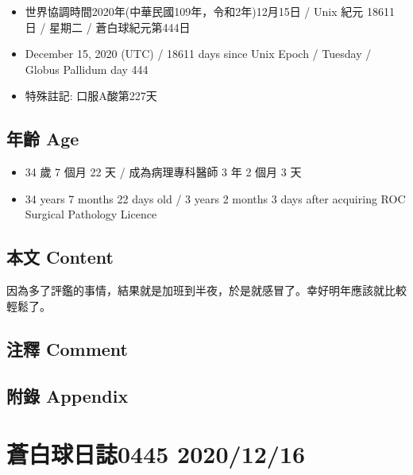 \documentclass[a5paper, 11pt
]{book}
\providecommand{\tightlist}{%
  \setlength{\itemsep}{0pt}\setlength{\parskip}{0pt}}
\begin{document}
\begin{itemize}
\tightlist
\item
  世界協調時間2020年(中華民國109年，令和2年)12月15日 / Unix 紀元 18611
  日 / 星期二 / 蒼白球紀元第444日
\item
  December 15, 2020 (UTC) / 18611 days since Unix Epoch / Tuesday /
  Globus Pallidum day 444
\item
  特殊註記: 口服A酸第227天
\end{itemize}

\hypertarget{ux5e74ux9f61-age-14}{%
\subsection{年齡 Age}\label{ux5e74ux9f61-age-14}}

\begin{itemize}
\tightlist
\item
  34 歲 7 個月 22 天 / 成為病理專科醫師 3 年 2 個月 3 天
\item
  34 years 7 months 22 days old / 3 years 2 months 3 days after
  acquiring ROC Surgical Pathology Licence
\end{itemize}

\hypertarget{ux672cux6587-content-14}{%
\subsection{本文 Content}\label{ux672cux6587-content-14}}

因為多了評鑑的事情，結果就是加班到半夜，於是就感冒了。幸好明年應該就比較輕鬆了。

\hypertarget{ux6ce8ux91cb-comment-14}{%
\subsection{注釋 Comment}\label{ux6ce8ux91cb-comment-14}}

\hypertarget{ux9644ux9304-appendix-14}{%
\subsection{附錄 Appendix}\label{ux9644ux9304-appendix-14}}

\hypertarget{ux84bcux767dux7403ux65e5ux8a8c0445-20201216}{%
\section{蒼白球日誌0445
2020/12/16}\label{ux84bcux767dux7403ux65e5ux8a8c0445-20201216}}
\end{document}
